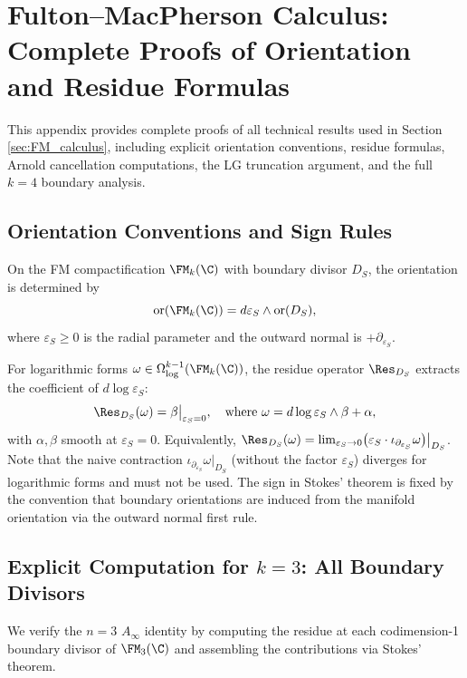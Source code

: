 \section{Fulton--MacPherson Calculus: Complete Proofs of Orientation and Residue Formulas}
\label{app:FM_Stokes}

This appendix provides complete proofs of all technical results used in Section \ref{sec:FM_calculus}, including explicit orientation conventions, residue formulas, Arnold cancellation computations, the LG truncation argument, and the full $k=4$ boundary analysis.

\subsection{Orientation Conventions and Sign Rules}

\begin{proposition}
\label{prop:orientation_formula}
On the FM compactification $\FM_k(\C)$ with boundary divisor $D_S$, the orientation is determined by
\[
\text{or}(\FM_k(\C)) = d\varepsilon_S \wedge \text{or}(D_S),
\]
where $\varepsilon_S \geq 0$ is the radial parameter and the outward normal is $+\partial_{\varepsilon_S}$.

For logarithmic forms $\omega \in \Omega^{k-1}_{\log}(\FM_k(\C))$, the residue operator $\Res_{D_S}$ extracts the coefficient of $d\log\varepsilon_S$:
\[
\Res_{D_S}(\omega) = \beta\big|_{\varepsilon_S = 0}, \quad \text{where } \omega = d\log\varepsilon_S \wedge \beta + \alpha,
\]
with $\alpha, \beta$ smooth at $\varepsilon_S = 0$. Equivalently, $\Res_{D_S}(\omega) = \lim_{\varepsilon_S \to 0}\bigl(\varepsilon_S \cdot \iota_{\partial_{\varepsilon_S}} \omega\bigr)\big|_{D_S}$. Note that the naive contraction $\iota_{\partial_{\varepsilon_S}} \omega\big|_{D_S}$ (without the factor $\varepsilon_S$) diverges for logarithmic forms and must not be used.
The sign in Stokes' theorem is fixed by the convention that boundary orientations are induced from the manifold orientation via the outward normal first rule.
\end{proposition}

\subsection{Explicit Computation for $k=3$: All Boundary Divisors}
\label{subsec:k3_complete}

We verify the $n=3$ $A_\infty$ identity by computing the residue at each codimension-1 boundary divisor of $\FM_3(\C)$ and assembling the contributions via Stokes' theorem.

